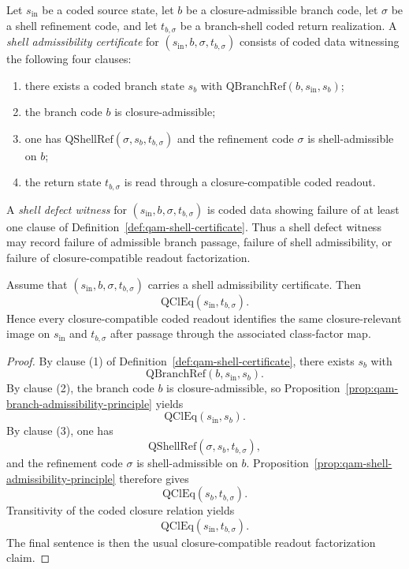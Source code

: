 \begin{definition}\label{def:qam-shell-certificate}
Let $s_{\mathrm{in}}$ be a coded source state, let $b$ be a closure-admissible branch code, let $\sigma$ be a shell refinement code, and let $t_{b,\sigma}$ be a branch-shell coded return realization. A \emph{shell admissibility certificate} for $(s_{\mathrm{in}},b,\sigma,t_{b,\sigma})$ consists of coded data witnessing the following four clauses:
\begin{enumerate}[leftmargin=2em]
 \item there exists a coded branch state $s_b$ with $\mathrm{QBranchRef}(b,s_{\mathrm{in}},s_b)$;
 \item the branch code $b$ is closure-admissible;
 \item one has $\mathrm{QShellRef}(\sigma,s_b,t_{b,\sigma})$ and the refinement code $\sigma$ is shell-admissible on $b$;
 \item the return state $t_{b,\sigma}$ is read through a closure-compatible coded readout.
\end{enumerate}
\end{definition}

\begin{definition}\label{def:qam-shell-defect-witness}
A \emph{shell defect witness} for $(s_{\mathrm{in}},b,\sigma,t_{b,\sigma})$ is coded data showing failure of at least one clause of Definition~\ref{def:qam-shell-certificate}. Thus a shell defect witness may record failure of admissible branch passage, failure of shell admissibility, or failure of closure-compatible readout factorization.
\end{definition}

\begin{lemma}\label{lem:qam-shell-certificate-closure}
Assume that $(s_{\mathrm{in}},b,\sigma,t_{b,\sigma})$ carries a shell admissibility certificate. Then
\[
\mathrm{QClEq}(s_{\mathrm{in}},t_{b,\sigma}).
\]
Hence every closure-compatible coded readout identifies the same closure-relevant image on $s_{\mathrm{in}}$ and $t_{b,\sigma}$ after passage through the associated class-factor map.
\end{lemma}

\begin{proof}
By clause (1) of Definition~\ref{def:qam-shell-certificate}, there exists $s_b$ with
\[
\mathrm{QBranchRef}(b,s_{\mathrm{in}},s_b).
\]
By clause (2), the branch code $b$ is closure-admissible, so Proposition~\ref{prop:qam-branch-admissibility-principle} yields
\[
\mathrm{QClEq}(s_{\mathrm{in}},s_b).
\]
By clause (3), one has
\[
\mathrm{QShellRef}(\sigma,s_b,t_{b,\sigma}),
\]
and the refinement code $\sigma$ is shell-admissible on $b$. Proposition~\ref{prop:qam-shell-admissibility-principle} therefore gives
\[
\mathrm{QClEq}(s_b,t_{b,\sigma}).
\]
Transitivity of the coded closure relation yields
\[
\mathrm{QClEq}(s_{\mathrm{in}},t_{b,\sigma}).
\]
The final sentence is then the usual closure-compatible readout factorization claim.
\end{proof}

